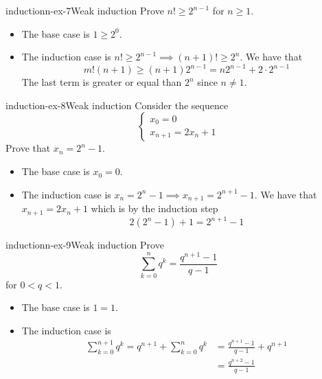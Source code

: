 \documentclass[preview]{standalone}
\begin{document}
\begin{snippetexercise}{inductionn-ex-7}{Weak induction}
    Prove \(n! \geq 2^{n-1}\) for \(n \geq 1\).
    \begin{itemize}
        \item The base case is \(1 \geq 2^0\).
        \item The induction case is \(n! \geq 2^{n-1} \implies (n+1)! \geq 2^n\).
        We have that \[m!(n+1) \geq (n+1)2^{n-1} = n2^{n-1} + 2\cdot2^{n-1}\]
        The last term is greater or equal than \(2^n\) since \(n\neq 1\).
    \end{itemize}
\end{snippetexercise}

\begin{snippetexercise}{induction-ex-8}{Weak induction}
    Consider the sequence
    \[
        \begin{cases}
            x_0 = 0 \\
            x_{n+1} = 2x_n + 1
        \end{cases}        
    \]
    Prove that \(x_n = 2^n - 1\).
    \begin{itemize}
        \item The base case is \(x_0 = 0\).
        \item The induction case is \(x_{n} = 2^n - 1 \implies x_{n+1} = 2^{n+1}-1\).
        We have that \(x_{n+1} = 2x_n + 1\) which is by the induction step
        \[2(2^n - 1) + 1 = 2^{n+1} - 1\]
    \end{itemize}
\end{snippetexercise}

\begin{snippetexercise}{inductionn-ex-9}{Weak induction}
    Prove \[
        \sum_{k=0}^n q^k = \frac{q^{n+1} - 1}{q-1}
    \]
    for \(0<q<1\).
    \begin{itemize}
        \item The base case is \(1 = 1\).
        \item The induction case is
        \begin{align*}
            \sum_{k=0}^{n + 1} q^k = q^{n+1} + \sum_{k=0}^n q^k &= \frac{q^{n+1} - 1}{q-1} + q^{n+1} \\
            &= \frac{q^{n+2}-1}{q-1}
        \end{align*}
    \end{itemize}
\end{snippetexercise}
\end{document}
